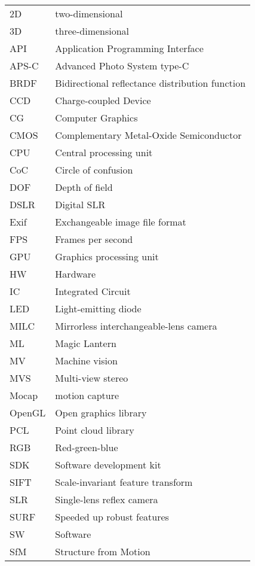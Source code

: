 \begin{tabular}{ll}
	2D & two-dimensional\\
	3D & three-dimensional\\
	API & Application Programming Interface\\
	APS-C & Advanced Photo System type-C\\
	BRDF & Bidirectional reflectance distribution function\\
	CCD & Charge-coupled Device\\
	CG & Computer Graphics\\
	CMOS & Complementary Metal-Oxide Semiconductor\\
	CPU & Central processing unit\\
	CoC & Circle of confusion\\
	DOF & Depth of field\\
	DSLR & Digital SLR\\
	Exif & Exchangeable image file format\\
	FPS & Frames per second\\
	GPU & Graphics processing unit\\
	HW & Hardware\\
	IC & Integrated Circuit\\
	LED & Light-emitting diode\\
	MILC & Mirrorless interchangeable-lens camera\\
	ML & Magic Lantern\\
	MV & Machine vision\\
	MVS & Multi-view stereo\\
	Mocap & motion capture\\
	OpenGL & Open graphics library\\
	PCL & Point cloud library\\
	RGB & Red-green-blue\\
	SDK & Software development kit\\
	SIFT & Scale-invariant feature transform\\
	SLR & Single-lens reflex camera\\
	SURF & Speeded up robust features \\
	SW & Software\\
	SfM & Structure from Motion\\
\end{tabular}

